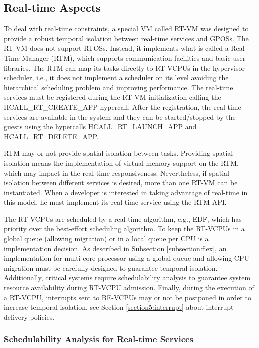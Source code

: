 \subsection{Real-time Aspects}
\label{subsection4:realtime}

To deal with real-time constraints, a special VM called RT-VM was designed to provide a robust temporal isolation between real-time services and GPOSs. The RT-VM does not support RTOSs. Instead, it implements what is  called a Real-Time Manager (RTM), which supports communication facilities and basic user libraries. The RTM can map its tasks directly to RT-VCPUs in the hypervisor scheduler, i.e., it does not implement a scheduler on its level avoiding the hierarchical scheduling problem and improving performance. The real-time services must be registered during the RT-VM initialization calling the HCALL\_RT\_CREATE\_APP hypercall. After the registration, the real-time services are available in the system and they can be started/stopped by the guests using the hypercalls HCALL\_RT\_LAU\-NCH\_APP and HCALL\_RT\_DELETE\_APP. 

RTM may or not provide spatial isolation between tasks. Providing spatial isolation means the implementation of virtual memory support on the RTM, which may impact in the real-time responsiveness. Nevertheless, if spatial isolation between different services is desired, more than one RT-VM can be instantiated. When a developer is interested in taking advantage of real-time in this model, he must implement its real-time service using the RTM API.

The RT-VCPUs are scheduled by a real-time algorithm, e.g., EDF, which has priority over the best-effort scheduling algorithm. To keep the RT-VCPUs in a global queue (allowing migration) or in a local queue per CPU is a implementation decision. As described in Subsection \ref{subsection:flex}, an implementation for multi-core processor using a global queue and allowing CPU migration must be carefully designed to guarantee temporal isolation. Additionally, critical systems require schedulability analysis to guarantee system resource availability during RT-VCPU admission. Finally, during the execution of a RT-VCPU, interrupts sent to BE-VCPUs may or not be postponed in order  to increase temporal isolation, see Section \ref{section5:interrupt} about interrupt delivery policies.

\subsubsection{Schedulability Analysis for Real-time Services}

